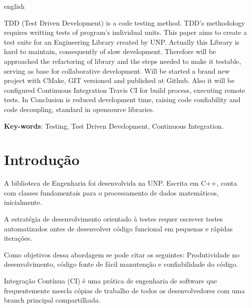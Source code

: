 \documentclass[
	article,			%
	12pt,				%
	oneside,			%
	a4paper,			%
	english,			
	brazil,
	sumario=tradicional
	]{abntex2}
\begin{document}
\begin{resumo}[Abstract]
 \begin{otherlanguage*}{english}
	
	TDD (Test Driven Development) is a code testing method. TDD's methodology requires writting tests of program's individual units. This paper aims to create a test suite for an Engineering Library created by UNP. Actually this Library is hard to maintain, consequently of slow development. Therefore will be approached the refactoring of library and the steps needed to make it testable, serving as base for collaborative development. Will be started a brand new project with CMake, GIT versioned and published at Github. Also it will be configured Continuous Integration Travis CI for build process, executing remote tests. In Conclusion is reduced development time, raising code confiability and code decoupling, standard in opensource libraries.
   \vspace{\onelineskip}
 
   \noindent 
   \textbf{Key-words}: Testing, Test Driven Development, Continuous Integration.
 \end{otherlanguage*}
\end{resumo}

\textual

\section*{Introdução}

A biblioteca de Engenharia foi desenvolvida na UNP. Escrita em C++, conta com classes fundamentais para o processamento de dados matemáticos, inicialmente. 

A estratégia de desenvolvimento orientado à testes requer escrever testes automatizados antes de desenvolver código funcional em pequenas e rápidas iterações. \cite[Abstract]{testdrivendevelopment.1}

Como objetivos dessa abordagem se pode citar os seguintes: Produtividade no desenvolvimento,
código fonte de fácil manutenção e confiabilidade do código.

Integração Contínua (CI) é uma prática de engenharia de software que frequentemente mescla cópias de trabalho de todos os desenvolvedores com uma branch principal compartilhada. \cite{vasilescu2015continuous}
\end{document}
